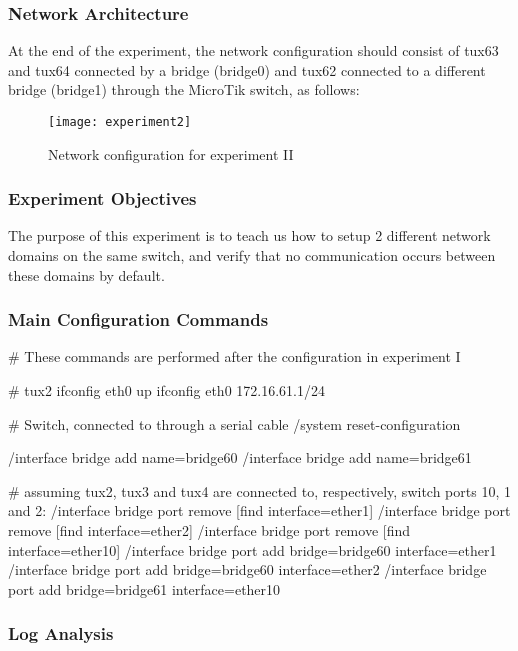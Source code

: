 \subsubsection{Network Architecture}

At the end of the experiment, the network configuration should consist of tux63 and tux64 connected by a bridge (bridge0) and tux62 connected to a different bridge (bridge1) through the MicroTik switch, as follows:

\begin{figure}[H]
    \centering
    \texttt{[image: experiment2]}
    \caption{Network configuration for experiment II}
\end{figure}

\subsubsection{Experiment Objectives}

The purpose of this experiment is to teach us how to setup 2 different network domains on the same switch, and verify that no communication occurs between these domains by default.

\subsubsection{Main Configuration Commands}

\begin{code-bash}
# These commands are performed after the configuration in experiment I

# tux2
ifconfig eth0 up
ifconfig eth0 172.16.61.1/24

# Switch, connected to through a serial cable
/system reset-configuration

/interface bridge add name=bridge60
/interface bridge add name=bridge61

# assuming tux2, tux3 and tux4 are connected to, respectively, switch ports 10, 1 and 2:
/interface bridge port remove [find interface=ether1]
/interface bridge port remove [find interface=ether2]
/interface bridge port remove [find interface=ether10]
/interface bridge port add bridge=bridge60 interface=ether1
/interface bridge port add bridge=bridge60 interface=ether2
/interface bridge port add bridge=bridge61 interface=ether10
\end{code-bash}

\subsubsection{Log Analysis}

